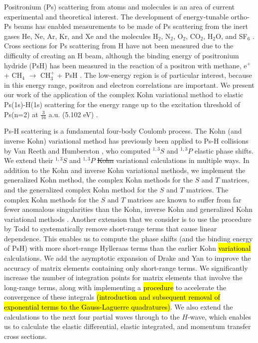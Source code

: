 \documentclass[preprint,showpacs,showkeys,preprintnumbers,amsmath,amssymb,longbibliography,pra,aps]{revtex4-1}
\begin{document}
Positronium (Ps) scattering from atoms and molecules is an area of current 
experimental and theoretical interest. The development of energy-tunable
ortho-Ps beams
\cite{Brown1985,Laricchia1987,Zafar1996,Garner1996,Laricchia2008} 
has enabled measurements to be made of Ps scattering from the inert gases He,
Ne, Ar, Kr, and Xe
\cite{Garner1996,Garner2000,Armitage2002,Laricchia2004,Armitage2006,Laricchia2008,Engbrecht2008,Brawley2010a}
and the molecules H$_2$, N$_2$, O$_2$, CO$_2$, H$_2$O, and SF$_6$
\cite{Garner1996,Garner1998,Garner2000,Laricchia2004,Armitage2006,Beale2006,Brawley2010a}.
Cross sections for Ps scattering from H have not been measured due to the
difficulty of creating an H beam, although the binding energy of positronium
hydride (PsH) has been measured in the reaction of a positron with methane,
e$^+$ + CH$_4$ $\to$ CH$_3^+$ + PsH \cite{Schrader1992}. The low-energy region
is of particular interest, because in this energy range, positron and electron 
correlations are important. We present
our work of the application of the complex Kohn variational 
method to elastic Ps(1s)-H(1s) scattering for the energy range
up to the excitation threshold of Ps(n=2) at $\tfrac{3}{16}$ a.u.
(5.102 eV) \cite{Conferences1,Conferences2,Conferences3,WoodsDiss2015}.

Ps-H scattering is a fundamental four-body Coulomb process. The Kohn (and 
inverse Kohn) variational method has previously been applied to Ps-H 
collisions by Van Reeth and Humberston \cite{VanReeth2003,VanReeth2004}, who 
computed $^{1,3}S$ and $^{1,3}P$ elastic phase shifts. We 
extend their $^{1,3}S$ and $^{1,3}P$ \sout{Kohn} variational calculations in 
multiple ways. In addition to
the Kohn and inverse Kohn variational methods, we implement the 
generalized Kohn method, the complex Kohn methods for the $S$ and $T$ matrices, and the
generalized complex Kohn method for the $S$ and $T$
matrices. The complex Kohn methods for the $S$ and $T$ matrices
are known to suffer from far fewer anomalous singularities than the Kohn,
inverse Kohn and generalized Kohn variational methods
\cite{Lucchese1989, Cooper2009, Cooper2010}. Another extension that we
consider is to use the procedure by Todd 
\cite{Todd2007} to systematically remove short-range terms that cause linear 
dependence. This enables us to compute the phase shifts (and the binding 
energy of PsH) with more short-range Hylleraas terms than the earlier 
Kohn \hl{variational} calculations. We add the asymptotic expansion of Drake and Yan
\cite{Drake1995, Yan1997} to improve the accuracy of matrix elements
containing only short-range terms. We significantly increase
the number of integration points for matrix
elements that involve the long-range terms, along with implementing a \hl{procedure} to
accelerate the convergence of these integrals \hl{(introduction
and subsequent removal of exponential terms to the Gauss-Laguerre
quadratures)}. We also extend the 
calculations to the next four partial waves through to the $H$-wave, which
enables us to calculate the elastic differential, elastic integrated,
and momentum transfer cross sections.
\end{document}
